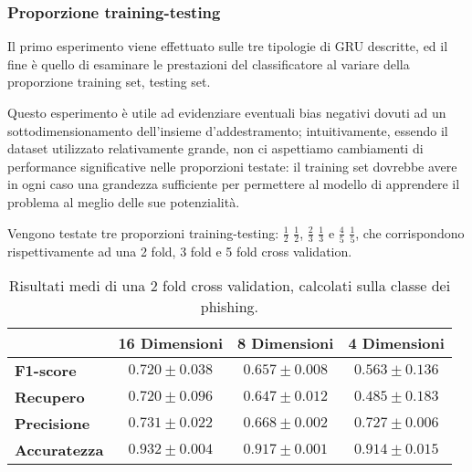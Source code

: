 \documentclass[../../main.tex]{subfiles}
\begin{document}
    \subsubsection{Proporzione training-testing}
    Il primo esperimento viene effettuato sulle tre tipologie di GRU descritte, ed il fine è quello di esaminare le prestazioni del classificatore al variare della proporzione training set, testing set. 
    
    Questo esperimento è utile ad evidenziare eventuali bias negativi dovuti ad un sottodimensionamento dell'insieme d'addestramento; intuitivamente, essendo il dataset utilizzato relativamente grande, non ci aspettiamo cambiamenti di performance significative nelle proporzioni testate: il training set dovrebbe avere in ogni caso una grandezza sufficiente per permettere al modello di apprendere il problema al meglio delle sue potenzialità.

    Vengono testate tre proporzioni training-testing: $\frac{1}{2}$ $\frac{1}{2}$, $\frac{2}{3}$ $\frac{1}{3}$ e $\frac{4}{5}$ $\frac{1}{5}$, che corrispondono rispettivamente ad una 2 fold, 3 fold e 5 fold cross validation.

    \begin{table}[H]
        \centering
        \begin{tabular}{lccc}
            \toprule
            {} &                      \textbf{16 Dimensioni} & \textbf{8 Dimensioni} & \textbf{4 Dimensioni} \\
            \midrule
            \textbf{F1-score }      &      $0.720 \pm 0.038$ & $0.657 \pm 0.008$ & $0.563 \pm 0.136$\\
            \textbf{Recupero   }    &      $0.720 \pm 0.096$ & $0.647 \pm 0.012$ & $0.485 \pm 0.183$\\
            \textbf{Precisione}     &      $0.731 \pm 0.022$ & $0.668 \pm 0.002$ & $0.727 \pm 0.006$\\
            \textbf{Accuratezza }   &      $0.932 \pm 0.004$ & $0.917 \pm 0.001$ & $0.914 \pm 0.015$\\
            \bottomrule
        \end{tabular}
        \caption{Risultati medi di una 2 fold cross validation, calcolati sulla classe dei phishing.}
        \label{tab:2foldCV}
    \end{table}
\end{document}
